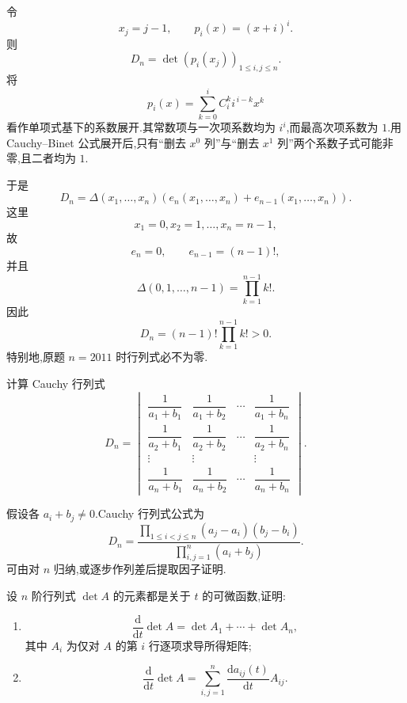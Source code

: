 \begin{solution}
令
\[
x_j=j-1,\qquad
p_i(x)=(x+i)^i.
\]
则
\[
D_n=\det\left(p_i(x_j)\right)_{1\leq i,j\leq n}.
\]
将
\[
p_i(x)
=
\sum\limits_{k=0}^{i}
C_{i}^{k} i^{\,i-k}x^k
\]
看作单项式基下的系数展开.其常数项与一次项系数均为 $i^i$,而最高次项系数为 $1$.用 Cauchy--Binet 公式展开后,只有``删去 $x^0$ 列''与``删去 $x^1$ 列''两个系数子式可能非零,且二者均为 $1$.

于是
\[
D_n
=
\Delta(x_1,\ldots,x_n)
\left(e_n(x_1,\ldots,x_n)+e_{n-1}(x_1,\ldots,x_n)\right).
\]
这里
\[
x_1=0,x_2=1,\ldots,x_n=n-1,
\]
故
\[
e_n=0,\qquad
e_{n-1}=(n-1)!,
\]
并且
\[
\Delta(0,1,\ldots,n-1)
=
\prod\limits_{k=1}^{n-1}k!.
\]
因此
\[
\boxed{
D_n
=
(n-1)!
\prod\limits_{k=1}^{n-1}k!
>0
}.
\]
特别地,原题 $n=2011$ 时行列式必不为零.
\end{solution}


\begin{example}[\markstar]
计算 Cauchy 行列式
\[
D_n=
\begin{vmatrix}
\dfrac{1}{a_1+b_1}&\dfrac{1}{a_1+b_2}&\cdots&\dfrac{1}{a_1+b_n}\\[6pt]
\dfrac{1}{a_2+b_1}&\dfrac{1}{a_2+b_2}&\cdots&\dfrac{1}{a_2+b_n}\\
\vdots&\vdots&&\vdots\\[4pt]
\dfrac{1}{a_n+b_1}&\dfrac{1}{a_n+b_2}&\cdots&\dfrac{1}{a_n+b_n}
\end{vmatrix}.
\]
\end{example}
\exampleblank

\begin{solution}
假设各 $a_i+b_j\neq0$.Cauchy 行列式公式为
\[
\boxed{
D_n
=
\dfrac{
\displaystyle
\prod\limits_{1\leq i<j\leq n}(a_j-a_i)(b_j-b_i)
}{
\displaystyle
\prod\limits_{i,j=1}^{n}(a_i+b_j)
}
}.
\]
可由对 $n$ 归纳,或逐步作列差后提取因子证明.
\end{solution}


\begin{example}[\markstar]
设 $n$ 阶行列式 $\det A$ 的元素都是关于 $t$ 的可微函数,证明:
\begin{enumerate}
  \item
  \[
  \dfrac{\mathrm{d}}{\mathrm{d}t}\det A
  =
  \det A_1+\cdots+\det A_n,
  \]
  其中 $A_i$ 为仅对 $A$ 的第 $i$ 行逐项求导所得矩阵;
  \item
  \[
  \dfrac{\mathrm{d}}{\mathrm{d}t}\det A
  =
  \sum\limits_{i,j=1}^{n}
  \dfrac{\mathrm{d}a_{ij}(t)}{\mathrm{d}t}A_{ij}.
  \]
\end{enumerate}
\end{example}
\exampleblank

